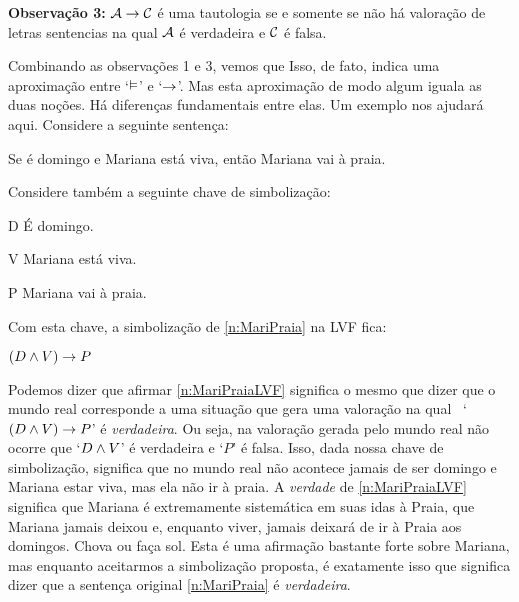 	\begin{ebullet}
		\item[\textbf{Observação 3:}] $\mathcal{A} \rightarrow \mathcal{C}$ é uma tautologia se e somente se não há valoração de letras sentencias na qual $\mathcal{A}$ é verdadeira e $\mathcal{C}$ é falsa.
	\end{ebullet}
Combinando as observações 1 e 3, vemos que
Isso, de fato, indica uma aproximação entre `$\vDash$' e `$\rightarrow$'.
Mas esta aproximação de modo algum iguala as duas noções.
Há diferenças fundamentais entre elas.
Um exemplo nos ajudará aqui.
Considere a seguinte sentença:
	\begin{earg}\setcounter{eargnum}{4}
		\item \label{n:MariPraia}Se é domingo e Mariana está viva, então Mariana vai à praia.
	\end{earg}
Considere também a seguinte chave de simbolização:
\begin{ekey}
	\item[D] É domingo.
	\item [V] Mariana está viva.
	\item[P] Mariana vai à praia.
\end{ekey}
Com esta chave, a simbolização de \ref{n:MariPraia} na LVF fica:
	\begin{earg}\setcounter{eargnum}{5}
		\item \label{n:MariPraiaLVF}$(D \wedge V) \rightarrow P$
	\end{earg}
Podemos dizer que afirmar \ref{n:MariPraiaLVF} significa o mesmo que dizer que o mundo real corresponde a uma situação que gera uma valoração na qual \mbox{ `$(D \wedge V) \rightarrow P$'} é \emph{verdadeira}.
Ou seja, na valoração gerada pelo mundo real não ocorre que `$D \wedge V$' é verdadeira e `$P$' é falsa.
Isso, dada nossa chave de simbolização, significa que no mundo real não acontece jamais de ser domingo e Mariana estar viva, mas ela não ir à praia.
A \emph{verdade} de \ref{n:MariPraiaLVF} significa que Mariana é extremamente sistemática em suas idas à Praia, que Mariana jamais deixou e, enquanto viver, jamais deixará de ir à Praia aos domingos. Chova ou faça sol.
Esta é uma afirmação bastante forte sobre Mariana, mas enquanto aceitarmos a simbolização proposta, é exatamente isso que significa dizer que a sentença original \ref{n:MariPraia} é \emph{verdadeira}.

